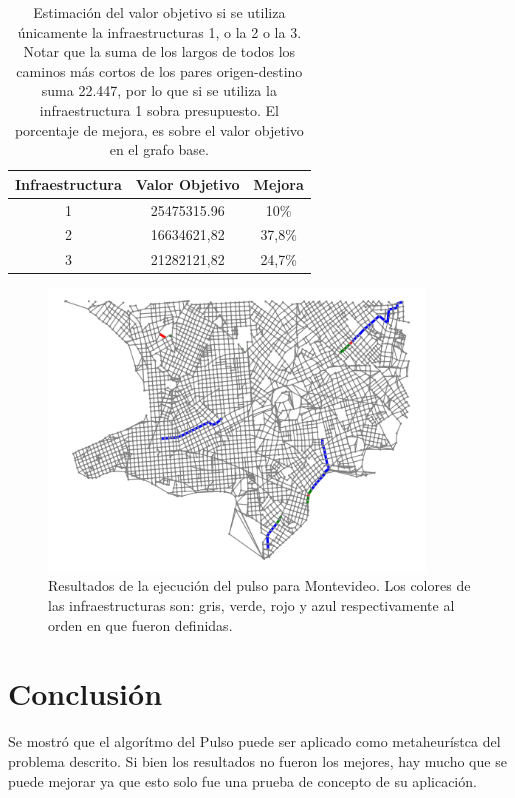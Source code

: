 \documentclass{article}
\begin{document}
  \begin{table}[h!]
    \centering
    \begin{tabular}{ccc}
      \toprule
      Infraestructura & Valor Objetivo & Mejora \\
      \midrule
      1 & 25475315.96 & 10\% \\
      2 & 16634621,82 & 37,8\% \\
      3 & 21282121,82 & 24,7\% \\
      \bottomrule
    \end{tabular}
    \caption{Estimación del valor objetivo si se utiliza únicamente la infraestructuras 1, o la 2 o la 3. Notar que la suma de los largos de todos los caminos más cortos de los pares origen-destino suma 22.447, por lo que si se utiliza la infraestructura 1 sobra presupuesto. El porcentaje de mejora, es sobre el valor objetivo en el grafo base.}
    \label{table:montevideoestimacion}
  \end{table}


  \begin{figure}[h!]
    \centering
    \includegraphics[width=10cm]{imgs/mdeo_large_pulse.png}
    \caption{Resultados de la ejecución del pulso para Montevideo. Los colores de las infraestructuras son: gris, verde, rojo y azul respectivamente al orden en que fueron definidas.}
    \label{resultadosmontevideo}
  \end{figure}

  \section*{Conclusión}

  Se mostró que el algorítmo del Pulso puede ser aplicado como metaheurístca del problema descrito. Si bien los resultados no fueron los mejores, hay mucho que se puede mejorar ya que esto solo fue una prueba de concepto de su aplicación.
\end{document}
